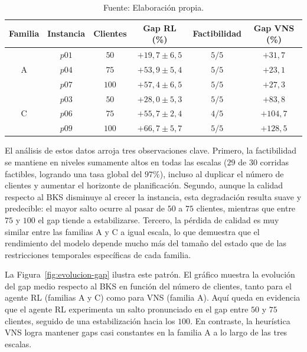 \begin{table}[H]
    \centering
    \caption{\label{tab:escalamiento} Resultados del escalamiento del agente a instancias de $75$ y $100$ clientes. Gap reportado como media $\pm$ desviación estándar sobre semillas factibles.}
    \caption*{Fuente: Elaboración propia.}
    \small
    \renewcommand{\arraystretch}{1.15}
    \setlength{\tabcolsep}{7pt}
    \begin{tabular}{@{}cccccc@{}}
        \toprule
        \textbf{Familia} & \textbf{Instancia} & \textbf{Clientes} & \textbf{Gap RL (\%)} & \textbf{Factibilidad} & \textbf{Gap VNS (\%)} \\
        \midrule
        \multirow{3}{*}{A} & $p01$ &  $50$ & $+19{,}7 \pm 6{,}5$ & $5/5$ & $+31{,}7$ \\
                           & $p04$ &  $75$ & $+53{,}9 \pm 5{,}4$ & $5/5$ & $+23{,}1$ \\
                           & $p07$ & $100$ & $+57{,}4 \pm 6{,}5$ & $5/5$ & $+27{,}3$ \\
        \midrule
        \multirow{3}{*}{C} & $p03$ &  $50$ & $+28{,}0 \pm 5{,}3$ & $5/5$ & $+83{,}8$ \\
                           & $p06$ &  $75$ & $+55{,}7 \pm 2{,}4$ & $4/5$ & $+104{,}7$ \\
                           & $p09$ & $100$ & $+66{,}7 \pm 5{,}7$ & $5/5$ & $+128{,}5$ \\
        \bottomrule
    \end{tabular}
\end{table}

El análisis de estos datos arroja tres observaciones clave. Primero, la factibilidad se mantiene en niveles sumamente altos en todas las escalas ($29$ de $30$ corridas factibles, logrando una tasa global del $97\%$), incluso al duplicar el número de clientes y aumentar el horizonte de planificación. Segundo, aunque la calidad respecto al BKS disminuye al crecer la instancia, esta degradación resulta suave y predecible: el mayor salto ocurre al pasar de $50$ a $75$ clientes, mientras que entre $75$ y $100$ el gap tiende a estabilizarse. Tercero, la pérdida de calidad es muy similar entre las familias A y C a igual escala, lo que demuestra que el rendimiento del modelo depende mucho más del tamaño del estado que de las restricciones temporales específicas de cada familia.

La Figura~\ref{fig:evolucion-gap} ilustra este patrón. El gráfico muestra la evolución del gap medio respecto al BKS en función del número de clientes, tanto para el agente RL (familias A y C) como para VNS (familia A). Aquí queda en evidencia que el agente RL experimenta un salto pronunciado en el gap entre $50$ y $75$ clientes, seguido de una estabilización hacia los $100$. En contraste, la heurística VNS logra mantener gaps casi constantes en la familia A a lo largo de las tres escalas.

